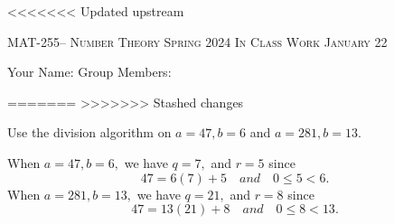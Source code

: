 \documentclass[handout]{ximera}
\date{January 22, 2024}
\date{\classday, 2024}
\begin{document}
\handoutAbstract
\maketitle
<<<<<<< Updated upstream
    \begin{center}%
            {\large \scshape MAT-255-- Number Theory \hfill Spring 2024 \hfill In Class Work January 22}%
        
        {\large
            Your Name: \hrulefill \quad Group Members:\hrulefill \quad \hrulefill
	    \par}%
    \end{center}%
=======
>>>>>>> Stashed changes

\begin{br} 
    Use the division algorithm on $a=47, b=6$ and $a=281, b=13$.
    \begin{solution}
        When $a=47, b=6,$ we have $q=7,$ and $r=5$ since \[47=6(7)+5\quad and \quad 0\leq 5 <6.\]
        When $a=281, b=13,$ we have $q=21,$ and $r=8$ since \[47=13(21)+8\quad and \quad 0\leq 8 <13.\]
    \end{solution}
    \pdfOnly{\ifhandout{
        \vfill}
        \else
        \fi}
\end{br}
\end{document}
